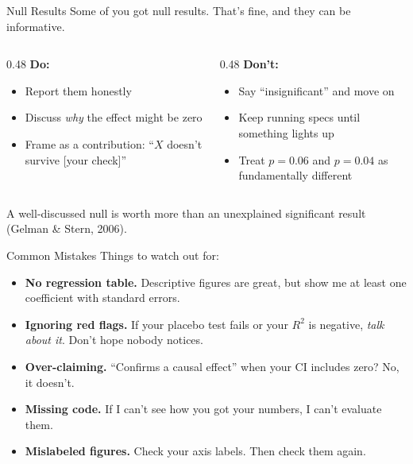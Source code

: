 \begin{frame}{Null Results}
  Some of you got null results. That's fine, and they can be informative.

  \vspace{6pt}

  \begin{columns}[T]
    \begin{column}{0.48\textwidth}
      \textbf{\textcolor{usfgreen}{Do:}}
      \begin{itemize}
        \item Report them honestly
        \item Discuss \emph{why} the effect might be zero
        \item Frame as a contribution: ``$X$ doesn't survive [your check]''
      \end{itemize}
    \end{column}
    \begin{column}{0.48\textwidth}
      \textbf{\textcolor{red!60}{Don't:}}
      \begin{itemize}
        \item Say ``insignificant'' and move on
        \item Keep running specs until something lights up
        \item Treat $p = 0.06$ and $p = 0.04$ as fundamentally different
      \end{itemize}
    \end{column}
  \end{columns}

  \vspace{8pt}

  A well-discussed null is worth more than an unexplained significant result {\small(Gelman \& Stern, 2006)}.
\end{frame}

\begin{frame}{Common Mistakes}
  Things to watch out for:

  \vspace{6pt}

  \begin{itemize}
    \item \textbf{No regression table.} Descriptive figures are great, but show me at least one coefficient with standard errors.
    \item \textbf{Ignoring red flags.} If your placebo test fails or your $R^2$ is negative, \emph{talk about it}. Don't hope nobody notices.
    \item \textbf{Over-claiming.} ``Confirms a causal effect'' when your CI includes zero? No, it doesn't.
    \item \textbf{Missing code.} If I can't see how you got your numbers, I can't evaluate them.
    \item \textbf{Mislabeled figures.} Check your axis labels. Then check them again.
  \end{itemize}
\end{frame}

